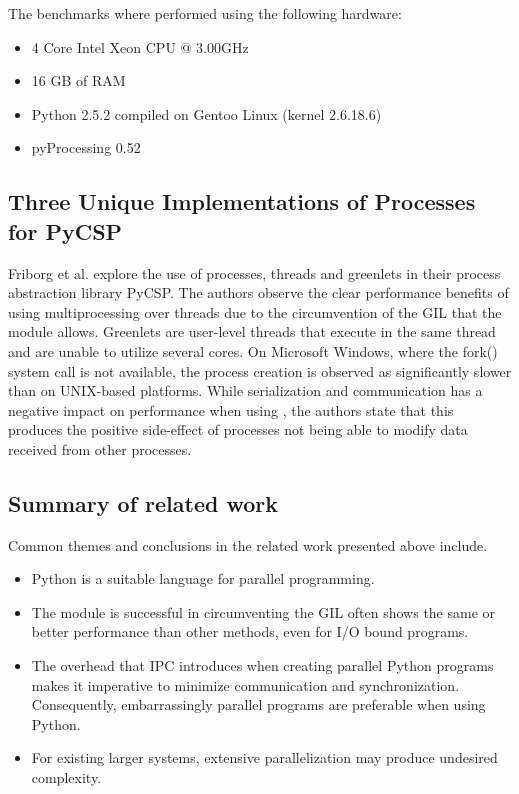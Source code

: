 The benchmarks where performed using the following hardware:
\begin{itemize}
  \item 4 Core Intel Xeon CPU @ 3.00GHz
  \item 16 GB of RAM
  \item Python 2.5.2 compiled on Gentoo Linux (kernel 2.6.18.6)
  \item pyProcessing 0.52
\end{itemize}

\subsection{Three Unique Implementations of Processes for PyCSP}
Friborg et al. \cite{friborg_2009_three_tuiopfp} explore the use of processes, threads and greenlets in their process abstraction
library PyCSP. The authors observe the clear performance benefits of using multiprocessing over threads due to the circumvention of the GIL
that the  module allows. Greenlets are user-level threads that execute in the same thread and are unable to utilize
several cores. On Microsoft Windows, where the fork() system call is not available, the process creation is observed as
significantly slower than on UNIX-based platforms. While serialization and communication has a negative impact on performance when
using , the authors state that this produces the positive side-effect of processes not being able to
modify data received from other processes.

\subsection{Summary of related work}
Common themes and conclusions in the related work presented above include.

\begin{itemize}
  \item Python is a suitable language for parallel programming.
  \item The  module is successful in circumventing the GIL often shows the same or better performance than other
    methods, even for I/O bound programs.
  \item The overhead that IPC introduces when creating parallel Python programs makes it imperative to minimize communication and
    synchronization. Consequently, embarrassingly parallel programs are preferable when using Python.
  \item For existing larger systems, extensive parallelization may produce undesired complexity.
\end{itemize}
